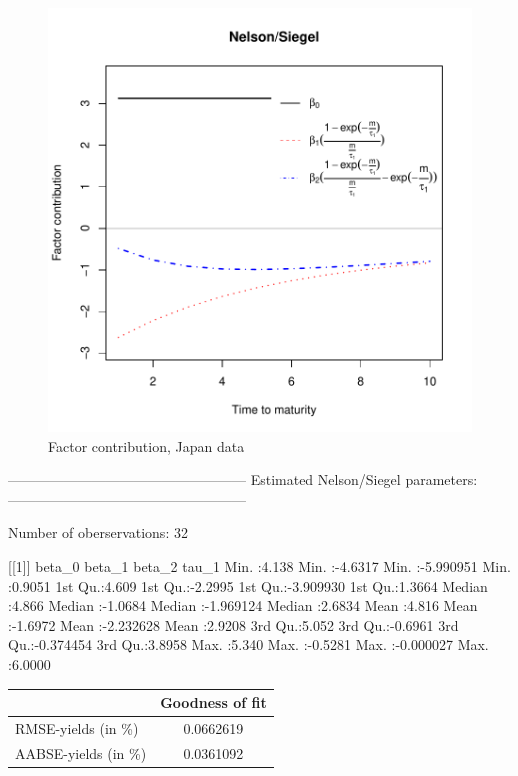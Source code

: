 \documentclass{article}
\begin{document}
\begin{spacing}{1.5}
\begin{center}
\begin{figure}[htbp]
\includegraphics{Graduation_Paper-015}
\caption{Factor contribution, Japan data}
\end{figure}
\end{center}

\begin{Schunk}
\begin{Soutput}
---------------------------------------------------
Estimated Nelson/Siegel parameters:
---------------------------------------------------

Number of oberservations: 32 

[[1]]
     beta_0          beta_1            beta_2              tau_1       
 Min.   :4.138   Min.   :-4.6317   Min.   :-5.990951   Min.   :0.9051  
 1st Qu.:4.609   1st Qu.:-2.2995   1st Qu.:-3.909930   1st Qu.:1.3664  
 Median :4.866   Median :-1.0684   Median :-1.969124   Median :2.6834  
 Mean   :4.816   Mean   :-1.6972   Mean   :-2.232628   Mean   :2.9208  
 3rd Qu.:5.052   3rd Qu.:-0.6961   3rd Qu.:-0.374454   3rd Qu.:3.8958  
 Max.   :5.340   Max.   :-0.5281   Max.   :-0.000027   Max.   :6.0000  
\end{Soutput}
\end{Schunk}

\begin{center}
\begin{tabular}{|l||c|}\hline
                        & Goodness of fit \\ \hline
RMSE-yields (in \%)     & 0.0662619   \\ \hline
AABSE-yields (in \%)    & 0.0361092   \\ \hline
\end{tabular}
\end{center}



\end{spacing}
\end{document}
